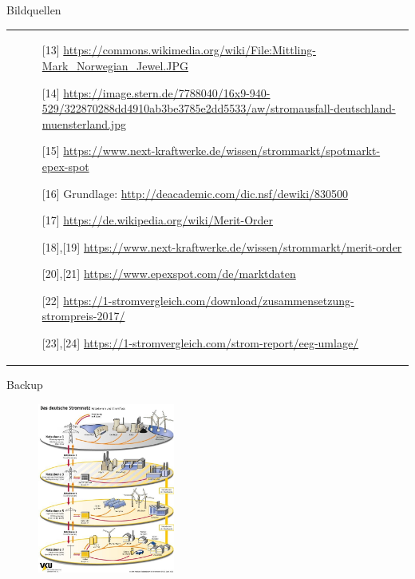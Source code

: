 \documentclass[aspectratio=1610, professionalfonts, 9pt]{beamer}
\begin{document}
\begin{frame}{Bildquellen}
  \begin{tabular}{p{}p{}}
&
 \begin{itemize}
\item[{[13]}] \url{https://commons.wikimedia.org/wiki/File:Mittling-Mark_Norwegian_Jewel.JPG}
\item[{[14]}] \url{https://image.stern.de/7788040/16x9-940-529/322870288dd4910ab3be3785e2dd5533/aw/stromausfall-deutschland-muensterland.jpg}
\item[{[15]}] \url{https://www.next-kraftwerke.de/wissen/strommarkt/spotmarkt-epex-spot}
\item[{[16]}] Grundlage: \url{http://deacademic.com/dic.nsf/dewiki/830500}
\item[{[17]}]  \url{https://de.wikipedia.org/wiki/Merit-Order}
\item[{[18],[19]}] \url{https://www.next-kraftwerke.de/wissen/strommarkt/merit-order}
\item[{[20],[21]}] \url{https://www.epexspot.com/de/marktdaten}
\item[{[22]}] \url{https://1-stromvergleich.com/download/zusammensetzung-strompreis-2017/}
\item[{[23],[24]}] \url{https://1-stromvergleich.com/strom-report/eeg-umlage/}
\end{itemize}
\\
\end{tabular}

\end{frame}


\begin{frame}{Backup}

\end{frame}


{
\begin{frame}
  \begin{figure}
    \includegraphics[width=0.4\textwidth]{images/netzebenen.jpg}
  \end{figure}
\end{frame}
}

%
\end{document}
